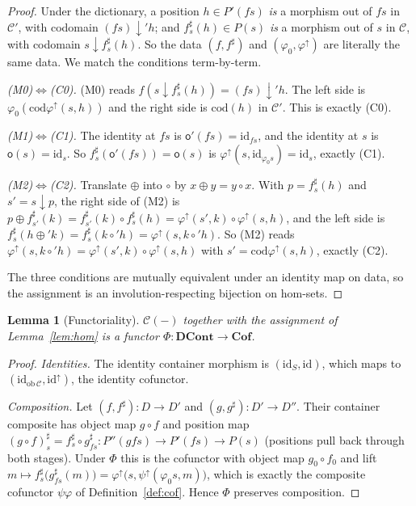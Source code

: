 \documentclass[11pt,a4paper]{article}
\newcommand{\Cof}{\mathbf{Cof}}
\newcommand{\DCont}{\mathbf{DCont}}
\newcommand{\id}{\mathrm{id}}
\newcommand{\cod}{\mathrm{cod}}
\newcommand{\ob}{\mathrm{ob}\,}
\theoremstyle{definition}\newtheorem{definition}{Definition}[section]
\theoremstyle{plain}\newtheorem{proposition}[definition]{Proposition}
\newtheorem{lemma}[definition]{Lemma}
\theoremstyle{remark}\newtheorem{example}[definition]{Example}
\begin{document}
\begin{proof}
Under the dictionary, a position $h\in P'(fs)$ \emph{is} a morphism out of $fs$
in $\mathcal C'$, with codomain $(fs)\downarrow' h$; and $f^\sharp_s(h)\in P(s)$
\emph{is} a morphism out of $s$ in $\mathcal C$, with codomain
$s\downarrow f^\sharp_s(h)$. So the data $(f,f^\sharp)$ and $(\varphi_0,
\varphi^\uparrow)$ are literally the same data. We match the conditions
term-by-term.

\emph{(M0)$\Leftrightarrow$(C0).} (M0) reads
$f(s\downarrow f^\sharp_s(h))=(fs)\downarrow' h$. The left side is
$\varphi_0(\cod\varphi^\uparrow(s,h))$ and the right side is $\cod(h)$ in
$\mathcal C'$. This is exactly (C0).

\emph{(M1)$\Leftrightarrow$(C1).} The identity at $fs$ is
$\mathsf o'(fs)=\id_{fs}$, and the identity at $s$ is $\mathsf o(s)=\id_s$. So
$f^\sharp_s(\mathsf o'(fs))=\mathsf o(s)$ is
$\varphi^\uparrow(s,\id_{\varphi_0 s})=\id_s$, exactly (C1).

\emph{(M2)$\Leftrightarrow$(C2).} Translate $\oplus$ into $\circ$ by
$x\oplus y=y\circ x$. With $p=f^\sharp_s(h)$ and $s'=s\downarrow p$, the right
side of (M2) is $p\oplus f^\sharp_{s'}(k)=f^\sharp_{s'}(k)\circ f^\sharp_s(h)
=\varphi^\uparrow(s',k)\circ\varphi^\uparrow(s,h)$, and the left side is
$f^\sharp_s(h\oplus' k)=f^\sharp_s(k\circ' h)=\varphi^\uparrow(s,k\circ' h)$.
So (M2) reads $\varphi^\uparrow(s,k\circ' h)=\varphi^\uparrow(s',k)\circ
\varphi^\uparrow(s,h)$ with $s'=\cod\varphi^\uparrow(s,h)$, exactly (C2).

The three conditions are mutually equivalent under an identity map on data, so
the assignment is an involution-respecting bijection on hom-sets.
\end{proof}

\begin{lemma}[Functoriality]\label{lem:fun}
$\mathcal C(-)$ together with the assignment of Lemma~\ref{lem:hom} is a
functor $\Phi\colon\DCont\to\Cof$.
\end{lemma}

\begin{proof}
\emph{Identities.} The identity container morphism is $(\id_S,\id)$, which maps
to $(\id_{\ob\mathcal C},\id^\uparrow)$, the identity cofunctor.

\emph{Composition.} Let $(f,f^\sharp)\colon D\to D'$ and
$(g,g^\sharp)\colon D'\to D''$. Their container composite has object map
$g\circ f$ and position map
$(g\circ f)^\sharp_s = f^\sharp_s\circ g^\sharp_{fs}\colon
P''(gfs)\to P'(fs)\to P(s)$
(positions pull back through both stages). Under $\Phi$ this is the cofunctor
with object map $g_0\circ f_0$ and lift
$m\mapsto f^\sharp_s\big(g^\sharp_{fs}(m)\big)
=\varphi^\uparrow\big(s,\psi^\uparrow(\varphi_0 s,m)\big)$,
which is exactly the composite cofunctor $\psi\varphi$ of
Definition~\ref{def:cof}. Hence $\Phi$ preserves composition.
\end{proof}
\end{document}
